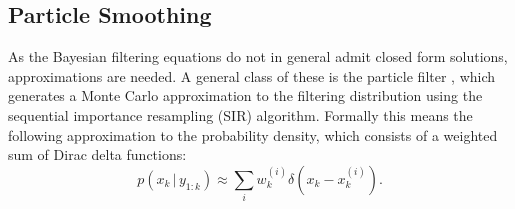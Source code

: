 \documentclass[twocolumn]{autart}    %
\newtheorem{algo}{Algorithm}[section]
\begin{document}
\subsection{Particle Smoothing}
%
As the Bayesian filtering equations do not in general admit closed
form solutions, approximations are needed. A general class of these is
the particle filter
\cite{Gordon+Salmon+Smith:1993,Kitagawa:1996,Doucet+Godsill+Andrieu:2000,Ristic+Arulampalam+Gordon:2004,Cappe+Godsill+Moulines:2007},
which generates a Monte Carlo approximation to the filtering
distribution using the sequential importance resampling (SIR)
algorithm. Formally this means the following approximation to the
probability density, which consists of a weighted sum of Dirac delta
functions:
%
\begin{equation}
  p(x_k\,|\,y_{1:k}) \approx \sum_i w_k^{(i)} \delta(x_k - x_k^{(i)}).
\label{eq:pfapp}
\end{equation}
%
%
%
%
%
\end{document}
